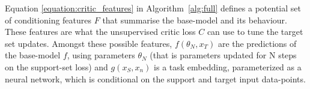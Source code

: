\documentclass{article} \usepackage[dvipsnames]{xcolor}
\begin{document}
\begin{comment}
The updated base-network parameters after $i$ steps on data from the support task $S_{b}$ be expressed with Equation \ref{equation:inner_support_update}, where $\alpha$ is the learning rate, $\theta^{b}_{i+1}$ are the base-network weights after $i+1$ steps towards task $b$, $\mathcal{L}_{S_{b}}(f_{\theta_{(i)}})$ is the loss on the support-set of task $b$ after $(i)$ (i.e. the previous step) update steps.
\end{comment}




\begin{comment}
Once the updates with respect to the support-set have been completed as per Equation \ref{maml_inner_support_update}, we begin to apply inner-loop steps with respect to the target-set's inputs. To do so, we build a collection of features that provide information about the base-model's state and behaviour (Equation \ref{equation:critic_features}), which we refer to as the \emph{critic feature-set} denoted as $F$, which can contain a range of possible features, such as the predictions of the base-model on the target-set's inputs $f(\theta_N, x_T)$, and/or the base-model's fully updated weights $\theta_N$, and/or a task embedding $g(x_S, x_n)$. Once obtained, the base-model feature collection $F$, can be passed to our critic network $C$, to generate a loss measure. 
\end{comment}
Equation \ref{equation:critic_features} in Algorithm~\ref{alg:full} defines a potential set of conditioning features $F$ that summarise the base-model and its behaviour. These features are what the unsupervised critic loss $C$ can use to tune the target set updates. Amongst these possible features, $f(\theta_N, x_T)$ are the predictions of the base-model $f$, using parameters $\theta_N$ (that is parameters updated for N steps on the support-set loss) and $g(x_S, x_n)$ is a task embedding, parameterized as a neural network, which is conditional on the support and target input data-points. 

\begin{comment}
Then gradients can be computed with respect to the target-set, which can be used to update our model with respect to the target as described in Equation \ref{equation:inner_target_update}. We call this the \emph{inner-loop target-set-adaption process}, which can be repeated for a number of times $I$. Finally, once the final base-model parameters $\theta_N+I$ are obtained, we can compute the target-set predictions and the outer loop optimization loss as expressed in Equation \ref{maml_outer_update_base} and \ref{maml_outer_update_critic}. 
\end{comment}
\end{document}
